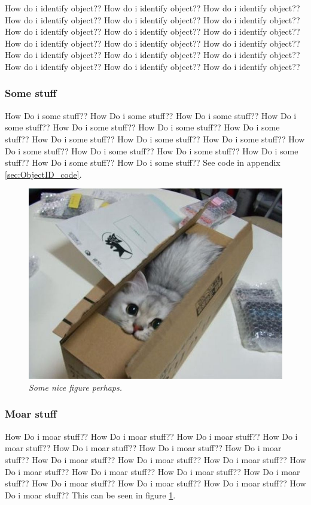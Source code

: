 How do i identify object?? How do i identify object?? How do i identify object?? How do i identify object?? How do i identify object?? How do i identify object?? How do i identify object?? How do i identify object?? How do i identify object?? How do i identify object?? How do i identify object?? How do i identify object?? How do i identify object?? How do i identify object?? How do i identify object?? How do i identify object?? How do i identify object?? How do i identify object??  

\subsubsection{Some stuff}
How Do i some stuff?? How Do i some stuff?? How Do i some stuff?? How Do i some stuff?? How Do i some stuff?? How Do i some stuff?? How Do i some stuff?? How Do i some stuff?? How Do i some stuff?? How Do i some stuff?? How Do i some stuff?? How Do i some stuff?? How Do i some stuff?? How Do i some stuff?? How Do i some stuff?? How Do i some stuff?? 
See code in appendix \ref{sec:ObjectID_code}. %

\begin{figure}[htb]
	\centering
	\includegraphics[width=\linewidth]{images/acatisfinetoo}
	\caption{\textit{Some nice figure perhaps.}}
	\label{fig:ObjID_fig} %
\end{figure}

\subsubsection{Moar stuff}
How Do i moar stuff?? How Do i moar stuff?? How Do i moar stuff?? How Do i moar stuff?? How Do i moar stuff?? How Do i moar stuff?? How Do i moar stuff?? How Do i moar stuff?? How Do i moar stuff?? How Do i moar stuff?? How Do i moar stuff?? How Do i moar stuff?? How Do i moar stuff?? How Do i moar stuff?? How Do i moar stuff?? How Do i moar stuff?? How Do i moar stuff?? How Do i moar stuff??  
This can be seen in figure \ref{fig:ObjID_fig}. %